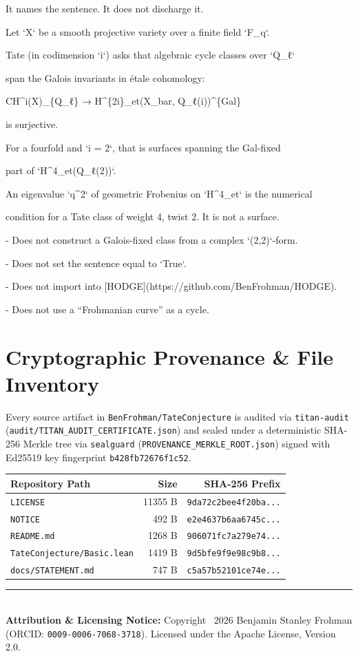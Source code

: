 \documentclass[11pt,a4paper]{article}
\begin{document}
It names the sentence. It does not discharge it.

Let `X` be a smooth projective variety over a finite field `F\_q`.

Tate (in codimension `i`) asks that algebraic cycle classes over `Q\_ℓ`

span the Galois invariants in étale cohomology:

CH\textasciicircum{}i(X)\_\{Q\_ℓ\}  →  H\textasciicircum{}\{2i\}\_et(X\_bar, Q\_ℓ(i))\textasciicircum{}\{Gal\}

is surjective.

For a fourfold and `i = 2`, that is surfaces spanning the Gal-fixed

part of `H\textasciicircum{}4\_et(Q\_ℓ(2))`.

An eigenvalue `q\textasciicircum{}2` of geometric Frobenius on `H\textasciicircum{}4\_et` is the numerical

condition for a Tate class of weight 4, twist 2. It is not a surface.

- Does not construct a Galois-fixed class from a complex `(2,2)`-form.

- Does not set the sentence equal to `True`.

- Does not import into [HODGE](https://github.com/BenFrohman/HODGE).

- Does not use a “Frohmanian curve” as a cycle.

\section{Cryptographic Provenance \& File Inventory}
Every source artifact in \texttt{BenFrohman/TateConjecture} is audited via \texttt{titan-audit}
(\texttt{audit/TITAN\_AUDIT\_CERTIFICATE.json}) and sealed under a deterministic SHA-256 Merkle tree via
\texttt{sealguard} (\texttt{PROVENANCE\_MERKLE\_ROOT.json}) signed with Ed25519 key fingerprint
\texttt{b428fb72676f1c52}.

\begin{center}
\small
\begin{tabular}{p{}rr}
\toprule
\textbf{Repository Path} & \textbf{Size} & \textbf{SHA-256 Prefix} \\
\midrule
\texttt{LICENSE} & 11355 B & \texttt{9da72c2bee4f20ba...} \\
\texttt{NOTICE} & 492 B & \texttt{e2e4637b6aa6745c...} \\
\texttt{README.md} & 1268 B & \texttt{906071fc7a279e74...} \\
\texttt{TateConjecture/Basic.lean} & 1419 B & \texttt{9d5bfe9f9e98c9b8...} \\
\texttt{docs/STATEMENT.md} & 747 B & \texttt{c5a57b52101ce74e...} \\
\bottomrule
\end{tabular}
\end{center}

\vfill
\noindent\rule{\textwidth}{0.4pt}\\
\footnotesize
\textbf{Attribution \& Licensing Notice:} Copyright \textcopyright\ 2026 Benjamin Stanley Frohman (ORCID: \texttt{0009-0006-7068-3718}).
Licensed under the Apache License, Version 2.0.
\end{document}
